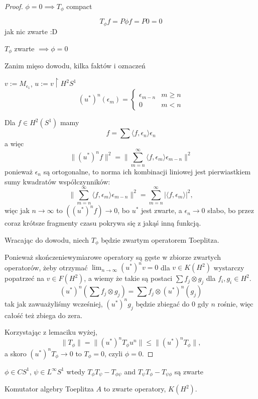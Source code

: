\documentclass[12pt]{book}
\begin{document}
\begin{proof}
  $\phi=0\implies T_\phi$ compact

  $$T_\phi f=P\phi f=P0=0$$
  jak nic zwarte :D

  $T_\phi$ zwarte $\implies \phi=0$

  Zanim mięso dowodu, kilka faktów i oznaczeń

  $v:=M_{\epsilon_1}$, $u:=v\restriction{H^2S^1}$
  $$(u^*)^n(\epsilon_m)=\begin{cases}\epsilon_{m-n} & m\geq n \\ 0 & m < n \end{cases}$$

  Dla $f\in H^2(S^1)$ mamy
  $$f=\sum \langle f, \epsilon_n\rangle \epsilon_n$$
  a więc
  $$\|(u^*)^nf\|^2=\|\sum_{m=n}^\infty\langle f,\epsilon_m\rangle \epsilon_{m-n}\|^2$$
  ponieważ $\epsilon_n$ są ortogonalne, to norma ich kombinacji liniowej jest pierwiastkiem sumy kwadratów współczynników:
  $$\|\sum_{m=n}^\infty\langle f,\epsilon_m\rangle \epsilon_{m-n}\|^2=\sum_{m=n}^\infty|\langle f,\epsilon_m\rangle|^2,$$
  więc jak $n\to \infty$ to $((u^*)^nf)\to 0$, bo $u^*$ jest zwarte, a $\epsilon_n\to 0$ słabo, bo przez coraz krótsze fragmenty czasu pokrywa się z jakąś inną funkcją.

  Wracając do dowodu, niech $T_\phi$ będzie zwartym operatorem Toeplitza.

  Ponieważ skończeniewymiarowe operatory są gęste w zbiorze zwartych operatorów, żeby otrzymać $\lim_{n\to\infty} (u^*)^nv=0$ dla $v\in K(H^2)$ wystarczy popatrzeć na  $v\in F(H^2)$, a wiemy że takie są postaci $\sum f_j\otimes g_j$ dla $f_i,g_i\in H^2$.
  $$(u^*)^n(\sum f_j\otimes g_j)=\sum f_j\otimes(u^*)^n(g_j)$$
  tak jak zawuażyliśmy wcześniej, $(u^*)^ng_j$ będzie zbiegać do $0$ gdy $n$ rośnie, więc całość też zbiega do zera.

  Korzystając z lemaciku wyżej,
  $$\| T_\phi\|=\|(u^*)^n T_\phi u^n\|\leq \|(u^*)^n T_\phi\|,$$
  a skoro $(u^*)^n T_\phi\to 0$ to $T_\phi=0$, czyli $\phi=0$.
\end{proof}

\begin{lemma}{}{}
  $\phi\in CS^1$, $\psi\in L^\infty S^1$ wtedy $T_\phi T_\psi-T_{\phi\psi}$ and $T_\psi T_\phi-T_{\psi\phi}$ są zwarte
\end{lemma}

\begin{theorem}{}{}
  Komutator algebry Toeplitza $A$ to zwarte operatory, $K(H^2)$.
\end{theorem}
\end{document}
